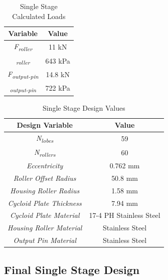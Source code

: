 \begin{table}
  \vskip0.2cm
  \caption{Single Stage Calculated Loads}
  \label{table:single_loads}
  \begin{center}
    \vskip-0.2cm
    \begin{tabular}{|c|c|}
    \hline
	Variable & Value\\
	\hline
	\textit{F\textsubscript{roller}} & 11 kN\\
	\hline
	\textit{\textsigma\textsubscript{roller}} & 643 kPa\\
	\hline
	\textit{F\textsubscript{output-pin}} & 14.8 kN\\
	\hline
	\textit{\textsigma\textsubscript{output-pin}} & 722 kPa\\
	\hline
    \end{tabular}
  \end{center}
\end{table}

\begin{table}
  \vskip0.2cm
  \caption{Single Stage Design Values}
  \label{table:single_sizing}
  \begin{center}
    \vskip-0.2cm
    \begin{tabular}{|c|c|}
    \hline
	Design Variable & Value\\
	\hline
	\textit{N\textsubscript{lobes}} & 59\\
	\hline
	\textit{N\textsubscript{rollers}} & 60\\
	\hline
	\textit{Eccentricity} & 0.762 mm\\
	\hline
	\textit{Roller Offset Radius} & 50.8 mm\\
	\hline
	\textit{Housing Roller Radius} & 1.58 mm\\
	\hline
	\textit{Cycloid Plate Thickness} & 7.94 mm\\
	\hline
	\textit{Cycloid Plate Material} & 17-4 PH Stainless Steel\\
	\hline
	\textit{Housing Roller Material} & Stainless Steel \todo{verify}\\
	\hline
	\textit{Output Pin Material} & Stainless Steel \todo{verify}\\
	\hline
    \end{tabular}
  \end{center}
\end{table}

\subsection{Final Single Stage Design} \label{ch:design:single:final}

